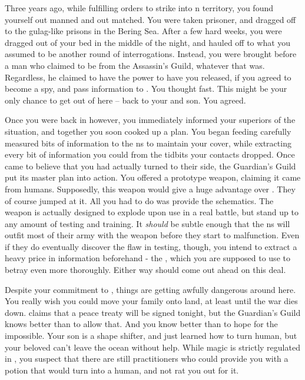 \documentclass[char]{NeptuneBall}
\begin{document}
Three years ago, while fulfilling orders to strike into \pPacifica{}n territory, you found yourself out manned and out matched. You were taken prisoner, and dragged off to the gulag-like prisons in the Bering Sea. After a few hard weeks, you were dragged out of your bed in the middle of the night, and hauled off to what you assumed to be another round of interrogations. Instead, you were brought before a man who claimed to be from the Assassin's Guild, whatever that was. Regardless, he claimed to have the power to have you released, if you agreed to become a spy, and pass information to \pPacifica{}. You thought fast. This might be your only chance to get out of here -- back to your \cQueen{\spouse} and son. You agreed.

Once you were back in \pAtlantis{} however, you immediately informed your superiors of the situation, and together you soon cooked up a plan. You began feeding carefully measured bits of information to the \pPacifica{}ns to maintain your cover, while extracting every bit of information you could from the tidbits your contacts dropped. Once \pPacifica{} came to believe that you had actually turned to their side, the Guardian's Guild put its master plan into action. You offered \pPacifica{} a prototype weapon, claiming it came from humans. Supposedly, this weapon would give \pPacifica{} a huge advantage over \pAtlantis{}. They of course jumped at it.  All you had to do was provide the schematics. The weapon is actually designed to explode upon use in a real battle, but stand up to any amount of testing and training. It \emph{should} be subtle enough that the \pPacifica{}ns will outfit most of their army with the weapon before they start to malfunction. Even if they do eventually discover the flaw in testing, though, you intend to extract a heavy price in information beforehand - the \iBattlePlan{}, which you are supposed to use to betray \pAtlantis{} even more thoroughly. Either way \pAtlantis{} should come out ahead on this deal.

Despite your commitment to \pAtlantis{}, things are getting awfully dangerous around here. You really wish you could move your family onto land, at least until the war dies down. \cKing{\King} \cKing{} claims that a peace treaty will be signed tonight, but the Guardian's Guild knows better than to allow that. And you know better than to hope for the impossible. Your son is a shape shifter, and just learned how to turn human, but your beloved \cQueen{\spouse} \cQueen{} can't leave the ocean without help. While magic is strictly regulated in \pAtlantis{}, you suspect that there are still practitioners who could provide you with a potion that would turn \cQueen{} into a human, and not rat you out for it.
\end{document}
